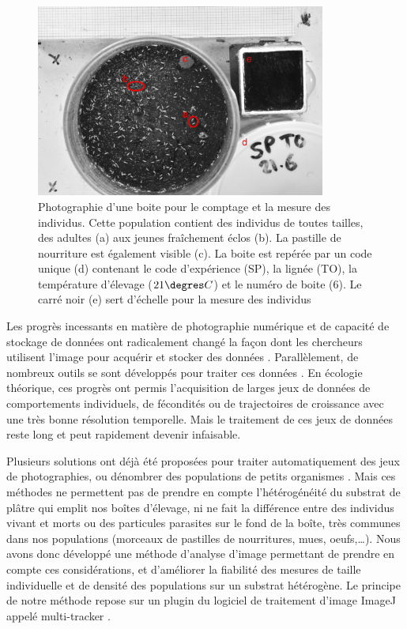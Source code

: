 \begin{figure}[!ht]
\begin{center}
\includegraphics[width=0.85\textwidth]{1_CorpsDeThese/Methodo/PhotoCount}
\caption[ Photo d’une boite pour le
comptage et la mesure des individus]{Photographie d'une boite pour le comptage
et la mesure des individus. Cette population contient des individus de toutes
tailles, des adultes (a) aux jeunes fraîchement éclos (b). La pastille de
nourriture est également visible (c). La boite est repérée par un code unique
(d) contenant le code d'expérience (SP), la lignée (TO), la température
d'élevage ($21\degres C$) et le numéro de boite (6). Le carré noir (e) sert
d'échelle pour la mesure des individus}
\label{fig:photocount}
\end{center}
\end{figure}

Les progrès incessants en matière de photographie numérique et de capacité de
stockage de données ont radicalement changé la façon dont les chercheurs
utilisent l'image pour acquérir et stocker des données \autocites{walter2005a}.
Parallèlement, de nombreux outils se sont développés pour traiter ces données
\autocites{eliceiri2012a,schneider2012a}. En écologie théorique, ces progrès ont
permis l'acquisition de larges jeux de données de comportements individuels, de
fécondités ou de trajectoires de croissance avec une très bonne résolution
temporelle. Mais le traitement de ces jeux de données reste long et peut
rapidement devenir infaisable. 

Plusieurs solutions ont déjà été proposées pour traiter automatiquement des jeux
de photographies, ou dénombrer des populations de petits organismes
\autocites{hooper2006a,krogh1998a,auclerc2010a,lukas2009a,marcal2006a}. Mais ces
méthodes ne permettent pas de prendre en compte l'hétérogénéité du substrat de
plâtre qui emplit nos boîtes d'élevage, ni ne fait la différence entre des
individus vivant et  morts ou des particules parasites sur le fond de la
boîte, très communes dans nos populations (morceaux de pastilles de
nourritures, mues, oeufs,\ldots). Nous avons donc développé une méthode
d'analyse d'image permettant de prendre en compte ces considérations, et
d'améliorer la fiabilité des mesures de taille individuelle et de densité des
populations sur un substrat hétérogène. Le principe de notre méthode repose sur
un plugin du logiciel de traitement d'image ImageJ appelé multi-tracker
\autocites{schneider2012a,kuhn2001a}.

